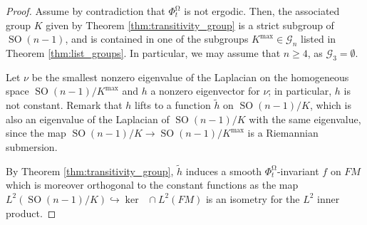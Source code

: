 \documentclass[12pt]{amsart}
\numberwithin{numbering}{section}
\theoremstyle{plain}
\theoremstyle{definition}
\theoremstyle{remark}
\numberwithin{equation}{section}
\DeclareMathOperator{\SO}{SO}
\DeclareMathOperator{\xs}{\mathbb{X}^{\mg}}
\DeclareMathOperator{\mg}{\Omega}
\begin{document}
\begin{proof}
Assume by contradiction that $\Phi_t^{\mg}$ is not ergodic. Then, the associated group $K$ given by Theorem \ref{thm:transitivity_group} is a strict subgroup of $\SO(n-1)$, and is contained in one of the subgroups $K^{\mathrm{max}} \in \mathcal{G}_n$ listed in Theorem \ref{thm:list_groups}. In particular, we may assume that $n \geq 4$, as $\mathcal{G}_3 = \emptyset$. 

\smallskip

Let $\nu$ be the smallest nonzero eigenvalue of the Laplacian on the homogeneous space $\SO(n-1)/K^{\mathrm{max}}$ and $h$ a nonzero eigenvector for $\nu$; in particular, $h$ is not constant. Remark that $h$ lifts to a function $\tilde{h}$ on $\SO(n-1)/K$, which is also an eigenvalue of the Laplacian of $\SO(n-1)/K$ with the same eigenvalue, since the map $\SO(n-1)/K \to \SO(n-1)/K^{\mathrm{max}}$ is a Riemannian submersion. 

By Theorem \ref{thm:transitivity_group}, $\tilde{h}$ induces a smooth $\Phi_t^{\mg}$-invariant $f$ on $FM$ which is moreover orthogonal to the constant functions as the map $L^2(\SO(n-1)/K) \hookrightarrow \ker \xs \cap L^2(FM)$ is an isometry for the $L^2$ inner product.

\medskip 


\end{proof}
\end{document}
